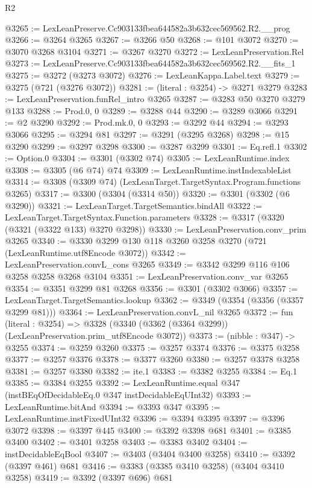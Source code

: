 \begin{lexlean}{R2}
\begin{coremodule}
@3265 := LexLeanPreserve.Cc903133fbea644582a3b632cec569562.R2.__prog
@3266 := @3264 @3265
@3267 := @3266 @50
@3268 := @101 @3072
@3270 := @3070 @3268 @3104
@3271 := @3267 @3270
@3272 := LexLeanPreservation.Rel
@3273 := LexLeanPreserve.Cc903133fbea644582a3b632cec569562.R2.__fits_1
@3275 := @3272 (@3273 @3072)
@3276 := LexLeanKappa.Label.text
@3279 := @3275 (@721 (@3276 @3072))
@3281 := (literal : @3254) -> @3271 @3279
@3283 := LexLeanPreservation.funRel_intro @3265
@3287 := @3283 @50 @3270 @3279 @133
@3288 := Prod.{0, 0}
@3289 := @3288 @44
@3290 := @3289 @3066
@3291 := @2 @3290
@3292 := Prod.mk.{0, 0}
@3293 := @3292 @44
@3294 := @3293 @3066
@3295 := @3294 @81
@3297 := @3291 (@3295 @3268)
@3298 := @15 @3290
@3299 := @3297 @3298
@3300 := @3287 @3299
@3301 := Eq.refl.{1}
@3302 := Option.{0}
@3304 := @3301 (@3302 @74)
@3305 := LexLeanRuntime.index
@3308 := @3305 (@6 @74) @74
@3309 := LexLeanRuntime.instIndexableList
@3314 := @3308 (@3309 @74) (LexLeanTarget.TargetSyntax.Program.functions @3265)
@3317 := @3300 (@3304 (@3314 @50))
@3320 := @3301 (@3302 (@6 @3290))
@3321 := LexLeanTarget.TargetSemantics.bindAll
@3322 := LexLeanTarget.TargetSyntax.Function.parameters
@3328 := @3317 (@3320 (@3321 (@3322 @133) @3270 @3298))
@3330 := LexLeanPreservation.conv_prim @3265
@3340 := @3330 @3299 @130 @118 @3260 @3258 @3270 (@721 (LexLeanRuntime.utf8Encode @3072))
@3342 := LexLeanPreservation.convL_cons @3265
@3349 := @3342 @3299 @116 @106 @3258 @3258 @3268 @3104
@3351 := LexLeanPreservation.conv_var @3265
@3354 := @3351 @3299 @81 @3268
@3356 := @3301 (@3302 @3066)
@3357 := LexLeanTarget.TargetSemantics.lookup
@3362 := @3349 (@3354 (@3356 (@3357 @3299 @81)))
@3364 := LexLeanPreservation.convL_nil @3265
@3372 := fun (literal : @3254) =>
  @3328 (@3340 (@3362 (@3364 @3299)) (LexLeanPreservation.prim_utf8Encode @3072))
@3373 := (nibble : @347) -> @3255
@3374 := @3259 @3260
@3375 := @3257 @3374
@3376 := @3375 @3258
@3377 := @3257 @3376
@3378 := @3377 @3260
@3380 := @3257 @3378 @3258
@3381 := @3257 @3380
@3382 := ite.{1}
@3383 := @3382 @3255
@3384 := Eq.{1}
@3385 := @3384 @3255
@3392 := LexLeanRuntime.equal @347 (instBEqOfDecidableEq.{0} @347 instDecidableEqUInt32)
@3393 := LexLeanRuntime.bitAnd
@3394 := @3393 @347
@3395 := LexLeanRuntime.instFixedUInt32
@3396 := @3394 @3395
@3397 := @3396 @3072
@3398 := @3397 @445
@3400 := @3392 @3398 @681
@3401 := @3385 @3400
@3402 := @3401 @3258
@3403 := @3383 @3402
@3404 := instDecidableEqBool
@3407 := @3403 (@3404 @3400 @3258)
@3410 := @3392 (@3397 @461) @681
@3416 := @3383 (@3385 @3410 @3258) (@3404 @3410 @3258)
@3419 := @3392 (@3397 @696) @681

\end{coremodule}
\end{lexlean}
